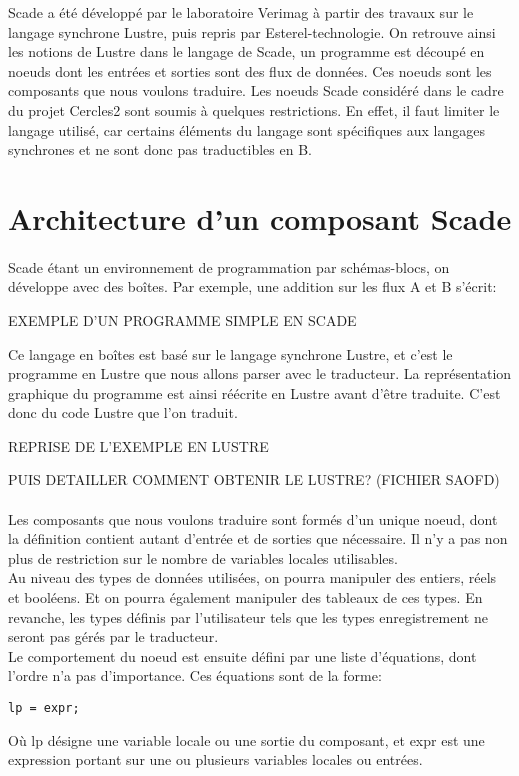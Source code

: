 


Scade a été développé par le laboratoire Verimag à partir des travaux sur
le langage synchrone Lustre, puis repris par Esterel-technologie. On retrouve
ainsi les notions de Lustre dans le langage de Scade, un programme est découpé
en noeuds dont les entrées et sorties sont des flux de données. Ces
noeuds sont les composants que nous voulons traduire. 
Les noeuds Scade considéré dans le cadre du projet Cercles2 sont
soumis à quelques restrictions. En effet, il faut limiter le langage
utilisé, car certains éléments du langage sont spécifiques aux
langages synchrones et ne sont donc pas traductibles en B.\\


\section{Architecture d'un composant Scade}

\paragraph{}
Scade étant un environnement de programmation par schémas-blocs, on
développe avec des boîtes. Par exemple, une addition sur les flux A
et B s'écrit:

EXEMPLE D'UN PROGRAMME SIMPLE EN SCADE

Ce langage en boîtes est basé sur le langage synchrone Lustre, et
c'est le programme en Lustre que nous allons parser avec le
traducteur. La représentation graphique du programme est ainsi
réécrite en Lustre avant d'être traduite. C'est donc du code Lustre
que l'on traduit.

REPRISE DE L'EXEMPLE EN LUSTRE

PUIS DETAILLER COMMENT OBTENIR LE LUSTRE?
(FICHIER SAOFD)

\paragraph{}
Les composants que nous voulons traduire sont formés d'un unique
noeud, dont la définition contient autant d'entrée et de sorties que
nécessaire. Il n'y a pas non plus de restriction sur le nombre de
variables locales utilisables.\\
Au niveau des types de données utilisées, on pourra manipuler
des entiers, réels et booléens. Et on pourra également manipuler des
tableaux de ces types. En revanche, les types définis par
l'utilisateur tels que les types enregistrement ne seront pas gérés
par le traducteur.\\
Le comportement du noeud est ensuite défini par une liste d'équations,
dont l'ordre n'a pas d'importance. Ces équations sont de la forme:
\begin{verbatim}
lp = expr;
\end{verbatim}
Où lp désigne une variable locale ou une sortie du composant, et expr
est une expression portant sur une ou plusieurs variables locales ou entrées.

